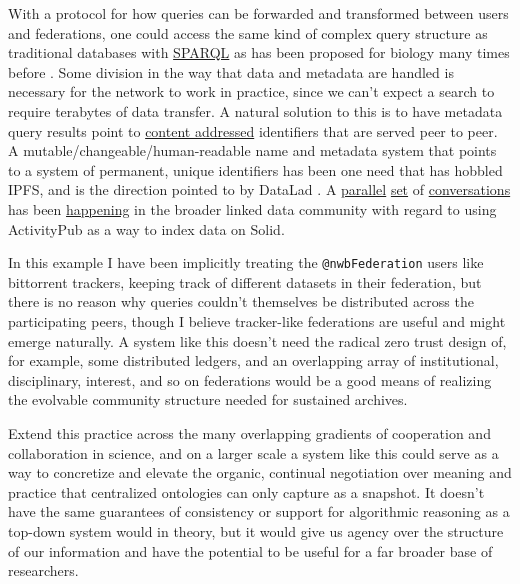 \documentclass[notoc]{tufte-book}
\begin{document}
With a protocol for how queries can be forwarded and transformed between
users and federations, one could access the same kind of complex query
structure as traditional databases with
\href{https://www.w3.org/TR/sparql11-federated-query/}{SPARQL} \citep{SPARQLFederatedQuery2013}  as has been proposed for biology many
times before \citep{simaEnablingSemanticQueries2019, djokic-petrovicPIBASFedSPARQLWebbased2017, hasnainBioFedFederatedQuery2017} . Some division in the way that data
and metadata are handled is necessary for the network to work in
practice, since we can't expect a search to require terabytes of data
transfer. A natural solution to this is to have metadata query results
point to
\href{https://en.wikipedia.org/wiki/Content-addressable_storage}{content
addressed} identifiers that are served peer to peer. A
mutable/changeable/human-readable name and metadata system that points
to a system of permanent, unique identifiers has been one need that has
hobbled IPFS, and is the direction pointed to by DataLad \citep{hankeDefenseDecentralizedResearch2021} . A
\href{https://mastodon.social/@humanetech/107155144840782386}{parallel}
\href{https://web.archive.org/web/20211024082055/https://socialhub.activitypub.rocks/t/which-links-between-activitypub-and-solid-project/529}{set}
of
\href{https://web.archive.org/web/20211024080845/https://socialhub.activitypub.rocks/t/how-solid-and-activitypub-complement-each-other-best/727}{conversations}
has been
\href{https://web.archive.org/web/20211024081238/https://forum.solidproject.org/t/discussion-solid-vs-activitypub/2685}{happening}
in the broader linked data community with regard to using ActivityPub as
a way to index data on Solid.

In this example I have been implicitly treating the
\texttt{@nwbFederation} users like bittorrent trackers, keeping track of
different datasets in their federation, but there is no reason why
queries couldn't themselves be distributed across the participating
peers, though I believe tracker-like federations are useful and might
emerge naturally. A system like this doesn't need the radical zero trust
design of, for example, some distributed ledgers, and an overlapping
array of institutional, disciplinary, interest, and so on federations
would be a good means of realizing the evolvable community structure
needed for sustained archives.

Extend this practice across the many overlapping gradients of
cooperation and collaboration in science, and on a larger scale a system
like this could serve as a way to concretize and elevate the organic,
continual negotiation over meaning and practice that centralized
ontologies can only capture as a snapshot. It doesn't have the same
guarantees of consistency or support for algorithmic reasoning as a
top-down system would in theory, but it would give us agency over the
structure of our information and have the potential to be useful for a
far broader base of researchers.
\end{document}
